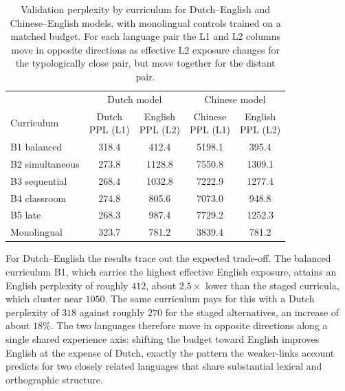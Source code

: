 \begin{table}[t]
\centering
\small
\begin{adjustbox}{max width=\columnwidth}
\begin{tabular}{@{}lcccc@{}}
\toprule
& \multicolumn{2}{c}{Dutch model} & \multicolumn{2}{c}{Chinese model} \\
\cmidrule(lr){2-3}\cmidrule(lr){4-5}
Curriculum & \makecell{Dutch\\PPL (L1)} & \makecell{English\\PPL (L2)} & \makecell{Chinese\\PPL (L1)} & \makecell{English\\PPL (L2)} \\
\midrule
B1 balanced      & 318.4 & 412.4  & 5198.1 & 395.4  \\
B2 simultaneous  & 273.8 & 1128.8 & 7550.8 & 1309.1 \\
B3 sequential    & 268.4 & 1032.8 & 7222.9 & 1277.4 \\
B4 classroom     & 274.8 & 805.6  & 7073.0 & 948.8  \\
B5 late          & 268.3 & 987.4  & 7729.2 & 1252.3 \\
\midrule
Monolingual      & 323.7 & 781.2  & 3839.4 & 781.2  \\
\bottomrule
\end{tabular}
\end{adjustbox}
\caption{Validation perplexity by curriculum for Dutch--English and
Chinese--English \beetle{} models, with monolingual controls trained on
a matched budget. For each language pair the L1 and L2 columns move in
opposite directions as effective L2 exposure changes for the
typologically close pair, but move together for the distant pair.}
\label{tab:ppl-curriculum}
\end{table}

For Dutch--English the results trace out the expected trade-off. The
balanced curriculum B1, which carries the highest effective English
exposure, attains an English perplexity of roughly $412$, about
$2.5\times$ lower than the staged curricula, which cluster near
$1050$. The same curriculum pays for this with a Dutch perplexity of
$318$ against roughly $270$ for the staged alternatives, an increase of
about $18\%$. The two languages therefore move in opposite directions
along a single shared experience axis: shifting the budget toward
English improves English at the expense of Dutch, exactly the pattern
the weaker-links account predicts for two closely related languages
that share substantial lexical and orthographic structure.

